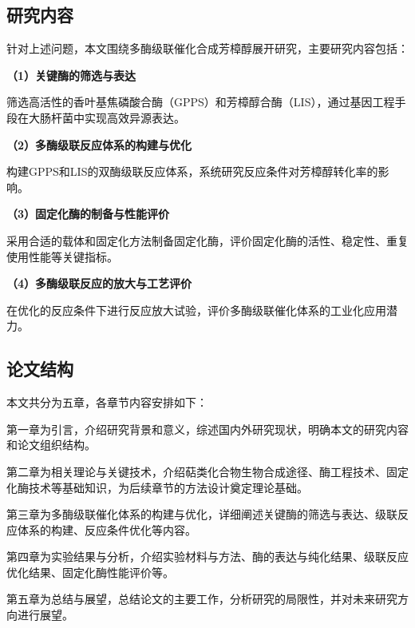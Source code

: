\subsection{研究内容}


针对上述问题，本文围绕多酶级联催化合成芳樟醇展开研究，主要研究内容包括：

\textbf{（1）关键酶的筛选与表达}


筛选高活性的香叶基焦磷酸合酶（GPPS）和芳樟醇合酶（LIS），通过基因工程手段在大肠杆菌中实现高效异源表达。

\textbf{（2）多酶级联反应体系的构建与优化}


构建GPPS和LIS的双酶级联反应体系，系统研究反应条件对芳樟醇转化率的影响。

\textbf{（3）固定化酶的制备与性能评价}


采用合适的载体和固定化方法制备固定化酶，评价固定化酶的活性、稳定性、重复使用性能等关键指标。

\textbf{（4）多酶级联反应的放大与工艺评价}


在优化的反应条件下进行反应放大试验，评价多酶级联催化体系的工业化应用潜力。

\subsection{论文结构}


本文共分为五章，各章节内容安排如下：

第一章为引言，介绍研究背景和意义，综述国内外研究现状，明确本文的研究内容和论文组织结构。

第二章为相关理论与关键技术，介绍萜类化合物生物合成途径、酶工程技术、固定化酶技术等基础知识，为后续章节的方法设计奠定理论基础。

第三章为多酶级联催化体系的构建与优化，详细阐述关键酶的筛选与表达、级联反应体系的构建、反应条件优化等内容。

第四章为实验结果与分析，介绍实验材料与方法、酶的表达与纯化结果、级联反应优化结果、固定化酶性能评价等。

第五章为总结与展望，总结论文的主要工作，分析研究的局限性，并对未来研究方向进行展望。
